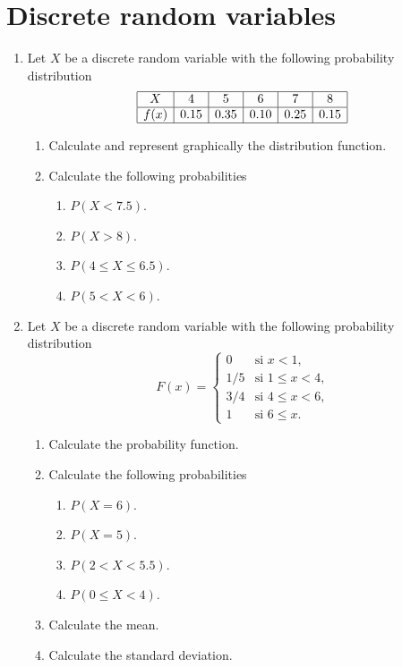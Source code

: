 
\section{Discrete random variables}
\begin{enumerate}[leftmargin=*,resume]

\item Let $X$ be a discrete random variable with the following probability distribution
\[
\begin{array}{|c|c|c|c|c|c|}
\hline
X & 4 & 5 & 6 & 7 & 8 \\ 
\hline
f(x) & 0.15 & 0.35 & 0.10 & 0.25 & 0.15 \\ 
\hline
\end{array}
\]
\begin{enumerate}
\item  Calculate and represent graphically the distribution function.
\item  Calculate the following probabilities
\begin{enumerate}
\item  $P(X<7.5)$.
\item  $P(X>8)$.
\item  $P(4\leq X\leq 6.5)$.
\item  $P(5<X<6)$.
\end{enumerate}
\end{enumerate}

\item Let $X$ be a discrete random variable with the following probability distribution
\[
F(x)=
\begin{cases}
0 & \text{si $x<1$,} \\
1/5 & \text{si $1\leq x< 4$,} \\
3/4 & \text{si $4\leq x<6$,} \\
1 & \text{si $6\leq x$.}
\end{cases}
\]

\begin{enumerate}
\item  Calculate the probability function.
\item  Calculate the following probabilities
\begin{enumerate}
\item  $P(X=6)$.
\item  $P(X=5)$.
\item  $P(2<X<5.5)$.
\item  $P(0\leq X<4)$.
\end{enumerate}
\item Calculate the mean. 
\item Calculate the standard deviation. 
\end{enumerate}


\end{enumerate}
